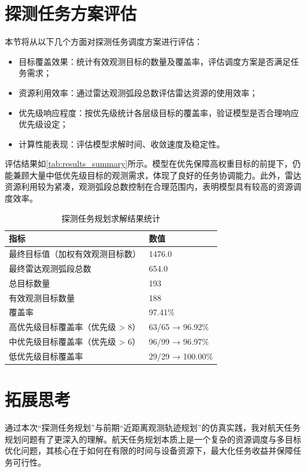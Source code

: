\documentclass[openany,12pt,UTF8]{ctexart}
\begin{document}
\section{探测任务方案评估}
本节将从以下几个方面对探测任务调度方案进行评估：
\begin{itemize}
    \item {目标覆盖效果}：统计有效观测目标的数量及覆盖率，评估调度方案是否满足任务需求；
    \item {资源利用效率}：通过雷达观测弧段总数评估雷达资源的使用效率；
    \item {优先级响应程度}：按优先级统计各层级目标的覆盖率，验证模型是否合理响应优先级设定；
    \item {计算性能表现}：评估模型求解时间、收敛速度及稳定性。
\end{itemize}

评估结果如\autoref{tab:results_summary}所示。模型在优先保障高权重目标的前提下，仍能兼顾大量中低优先级目标的观测需求，体现了良好的任务协调能力。此外，雷达资源利用较为紧凑，观测弧段总数控制在合理范围内，表明模型具有较高的资源调度效率。
\begin{table}[h]
    \centering
    \caption{探测任务规划求解结果统计}
    \label{tab:results_summary}
    \begin{tabular}{ll}
        \toprule
        \textbf{指标}        & \textbf{数值}      \\
        \midrule
        最终目标值（加权有效观测目标数）   & 1476.0           \\
        最终雷达观测弧段总数         & 654.0            \\
        总目标数量              & 193              \\
        有效观测目标数量           & 188              \\
        覆盖率                & 97.41\%          \\
        高优先级目标覆盖率（优先级 > 8） & 63/65 → 96.92\%  \\
        中优先级目标覆盖率（优先级 > 6） & 96/99 → 96.97\%  \\
        低优先级目标覆盖率          & 29/29 → 100.00\% \\
        \bottomrule
    \end{tabular}
\end{table}

\section{拓展思考}
通过本次“探测任务规划”与前期“近距离观测轨迹规划”的仿真实践，我对航天任务规划问题有了更深入的理解。航天任务规划本质上是一个复杂的资源调度与多目标优化问题，其核心在于如何在有限的时间与设备资源下，最大化任务收益并保障任务可行性。
\end{document}
